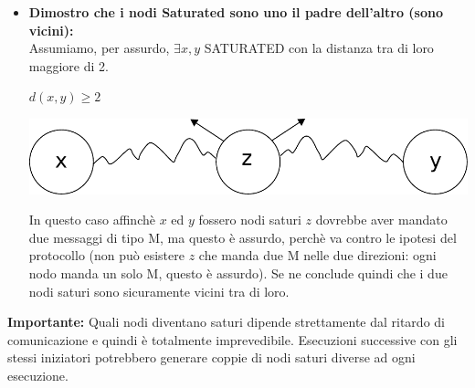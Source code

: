 {\begin{itemize}
    \textbf{Altra possibile dimostrazione:} Si può confermare che i nodi saturi sono 2 per la correttezza del Convergecast. Durante questo protocollo, ogni entità manda esattamente un messaggio, ma dato che le entità sono $n$ e gli archi in un albero sono $n-1$, ci sarà per forza un arco in cui transiteranno due messaggi M, e quell'arco è proprio quello che congiunge i due nodi saturi.
    
    
    \item \textbf{Dimostro che i nodi Saturated sono uno il padre dell'altro (sono vicini):}\\  Assumiamo, per assurdo, $\exists x,y$ SATURATED con la distanza tra di loro maggiore di 2.
  \begin{center}
    $d(x,y) \geq 2$

    \includegraphics[scale=0.5]{images/n_41}
  \end{center}

In questo caso affinchè $x$ ed $y$ fossero nodi saturi $z$ dovrebbe aver mandato due messaggi di tipo M, ma questo è assurdo, perchè va contro le ipotesi del protocollo (non può esistere $z$ che manda due M nelle due direzioni: ogni nodo manda un solo M, questo è assurdo). Se ne conclude quindi che i due nodi saturi sono sicuramente vicini tra di loro.

\end{itemize}
}

\textbf{Importante:} Quali nodi diventano saturi dipende strettamente dal ritardo di comunicazione e quindi è totalmente imprevedibile. Esecuzioni successive con gli stessi iniziatori potrebbero generare coppie di nodi saturi diverse ad ogni esecuzione.

